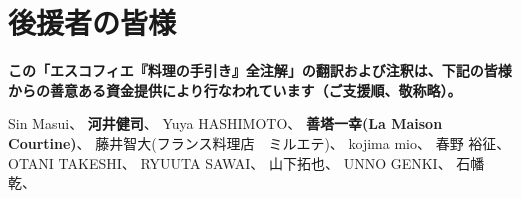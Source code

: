 \hypertarget{benefactors}{%
\section{後援者の皆様}\label{benefactors}}

\thispagestyle{empty}

\small

\textbf{この「エスコフィエ『料理の手引き』全注解」の翻訳および注釈は、下記の皆様からの善意ある資金提供により行なわれています（ご支援順、敬称略）。}

\normalsize
\vspace{1\zw}

Sin Masui、\href{20180524-23h,2x,novelsoundsmail@gmail.com}{}
\textbf{河井健司}、\href{20180525-0h14,10x,20180605-11h42,10x,kwibeng@gmail.com}{}
Yuya HASHIMOTO、\href{20180525-1h40,2x,hashimo0910@gmail.com}{}
\textbf{善塔一幸(La Maison
Courtine)}、\href{20180525-8h56,10x,kazuyukizento120@docomo.ne.jp}{}
藤井智大(フランス料理店　ミルエテ)、\href{20180525-10h07,1x,apple19761019@yahoo.co.jp}{}
kojima mio、\href{20180525-12h23,1x,teeeeshow@yahoo.co.jp}{} 春野
裕征、\href{20180528-2h41,1x,amanojack.v-o-v@i.softbank.jp}{} OTANI
TAKESHI、\href{20180529-17h26,2x,1000feuille@ezweb.ne.jp}{} RYUUTA
SAWAI、\href{20180530-2h57.1x,rs.ajtk.zz@i.softbank.jp}{}
山下拓也、\href{20180605-11h04,5x,FB:Takuya\%20Yamashita}{} UNNO
GENKI、\href{20180605-22h12,1x,guriiva@aol.com}{}
石幡乾、\href{201806060-6h24,1x,zonek.gentile.bonheur.ken05@gmail.com}{}
